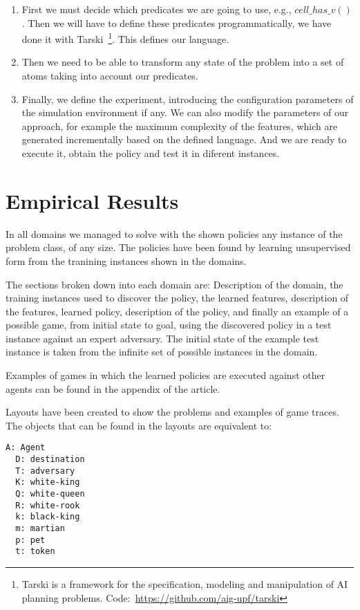 \documentclass[a4paper]{article}
\begin{document}
\begin{enumerate}
  \item First we must decide which predicates we are going to use, e.g., $cell\_has\_v()$ . Then we will have to define these predicates programmatically, we have done it with Tarski~\footnote{Tarski is a framework for the specification, modeling and manipulation of AI planning problems. Code:~\url{https://github.com/aig-upf/tarski}}. This defines our language.

  \item Then we need to be able to transform any state of the problem into a set of atoms taking into account our predicates.

  \item Finally, we define the experiment, introducing the configuration parameters of the simulation environment if any. We can also modify the parameters of our approach, for example the maximum complexity of the features, which are generated incrementally based on the defined language. And we are ready to execute it, obtain the policy and test it in diferent instances.
\end{enumerate}


\newpage

\section{Empirical Results}

In all domains we managed to solve with the shown policies any instance of the problem class, of any size. The policies have been found by learning unsupervised form from the tranining instances shown in the domains.

The sections broken down into each domain are: Description of the domain, the training instances used to discover the policy, the learned features, description of the features, learned policy, description of the policy, and finally an example of a possible game, from initial state to goal, using the discovered policy in a test instance against an expert adversary. The initial state of the example test instance is taken from the infinite set of possible instances in the domain.

Examples of games in which the learned policies are executed against other agents can be found in the appendix of the article.

Layouts have been created to show the problems and examples of game traces. The objects that can be found in the layouts are equivalent to:
\begin{Verbatim}[fontsize=\footnotesize]
  A: Agent
  D: destination
  T: adversary
  K: white-king
  Q: white-queen
  R: white-rook
  k: black-king
  m: martian
  p: pet
  t: token
\end{Verbatim}
\end{document}
